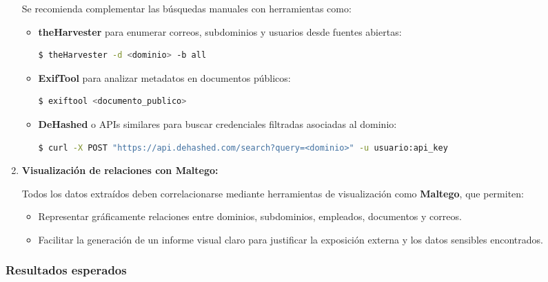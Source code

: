 \documentclass[a4paper, 11pt]{article}
\begin{document}
\begin{enumerate}
    Se recomienda complementar las búsquedas manuales con herramientas como:

    \begin{itemize}
        \item \textbf{theHarvester} para enumerar correos, subdominios y usuarios desde fuentes abiertas:
        \begin{lstlisting}[language=bash, style=terminalstyle, caption=Enumeración con theHarvester]
$ theHarvester -d <dominio> -b all
        \end{lstlisting}

        \item \textbf{ExifTool} para analizar metadatos en documentos públicos:
        \begin{lstlisting}[language=bash, style=terminalstyle, caption=Extracción de metadatos]
$ exiftool <documento_publico>
        \end{lstlisting}

        \item \textbf{DeHashed} o APIs similares para buscar credenciales filtradas asociadas al dominio:
        \begin{lstlisting}[language=bash, style=terminalstyle, caption=Búsqueda de filtraciones con DeHashed]
$ curl -X POST "https://api.dehashed.com/search?query=<dominio>" -u usuario:api_key
        \end{lstlisting}
    \end{itemize}

    \item \textbf{Visualización de relaciones con Maltego:}

    Todos los datos extraídos deben correlacionarse mediante herramientas de visualización como \textbf{Maltego}, que permiten:

    \begin{itemize}
        \item Representar gráficamente relaciones entre dominios, subdominios, empleados, documentos y correos.
        \item Facilitar la generación de un informe visual claro para justificar la exposición externa y los datos sensibles encontrados.
    \end{itemize}

\end{enumerate}


\subsubsection*{Resultados esperados}
\end{document}

